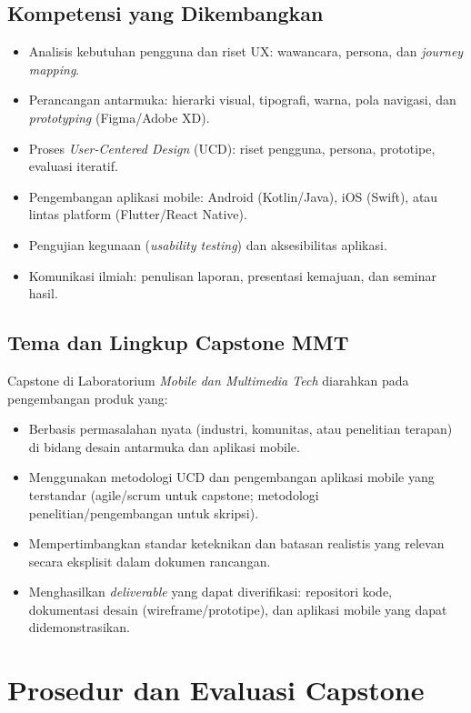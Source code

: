 \documentclass[12pt,a4paper]{report}
\begin{document}
\section{Kompetensi yang Dikembangkan}
\begin{itemize}
\item Analisis kebutuhan pengguna dan riset UX: wawancara, persona, dan \emph{journey mapping}.
\item Perancangan antarmuka: hierarki visual, tipografi, warna, pola navigasi, dan \emph{prototyping} (Figma/Adobe XD).
\item Proses \emph{User-Centered Design} (UCD): riset pengguna, persona, prototipe, evaluasi iteratif.
\item Pengembangan aplikasi mobile: Android (Kotlin/Java), iOS (Swift), atau lintas platform (Flutter/React Native).
\item Pengujian kegunaan (\emph{usability testing}) dan aksesibilitas aplikasi.
\item Komunikasi ilmiah: penulisan laporan, presentasi kemajuan, dan seminar hasil.
\end{itemize}

\section{Tema dan Lingkup Capstone MMT}
Capstone di Laboratorium \emph{Mobile dan Multimedia Tech} diarahkan pada pengembangan produk yang:
\begin{itemize}
\item Berbasis permasalahan nyata (industri, komunitas, atau penelitian terapan) di bidang desain antarmuka dan aplikasi mobile.
\item Menggunakan metodologi UCD dan pengembangan aplikasi mobile yang terstandar (agile/scrum untuk capstone; metodologi penelitian/pengembangan untuk skripsi).
\item Mempertimbangkan standar keteknikan dan batasan realistis yang relevan secara eksplisit dalam dokumen rancangan.
\item Menghasilkan \emph{deliverable} yang dapat diverifikasi: repositori kode, dokumentasi desain (wireframe/prototipe), dan aplikasi mobile yang dapat didemonstrasikan.
\end{itemize}

\chapter{Prosedur dan Evaluasi Capstone}
\end{document}
